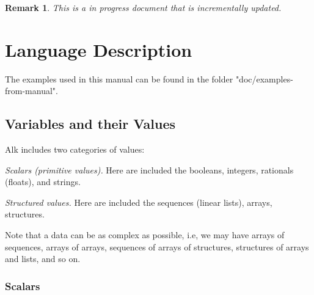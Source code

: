 \documentclass[a4paper]{report}
\newtheorem*{remark}{Remark}
\begin{document}
%
%
%

\begin{remark}
This is a in progress document that is incrementally updated.
\end{remark}

\chapter{Language Description}

The examples used in this manual can be found in the folder "doc/examples-from-manual".

\section{Variables and their Values}

Alk includes two categories of values:
\begin{list}{}{3ex}
\item[\it Scalars (primitive values).] Here are included the booleans, integers, rationals (floats), and strings. 
\item[\it Structured values.] Here are included the  sequences (linear lists), arrays, structures. 
\end{list} 
Note that a data can be as complex as possible, i.e, we may have arrays of sequences, arrays of arrays, sequences of arrays of structures, structures of arrays and lists, and so on.

\subsection{Scalars}
\end{document}
